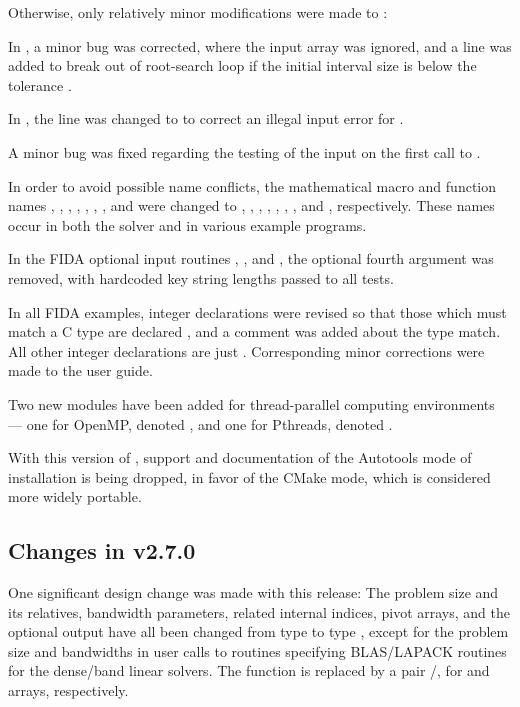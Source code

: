 Otherwise, only relatively minor modifications were made to {\ida}:

In , a minor bug was corrected, where the input
array  was ignored, and a line was added to break out of
root-search loop if the initial interval size is below the tolerance
.

In , the line  was changed to
 to correct an illegal input error for .

A minor bug was fixed regarding the testing of the input  on
the first call to .

In order to avoid possible name conflicts, the mathematical macro
and function names , , , , ,
, , and  were changed to
, , , , ,
, , and , respectively.
These names occur in both the solver and in various example programs.

In the FIDA optional input routines , ,
and , the optional fourth argument  was
removed, with hardcoded key string lengths passed to all 
tests.

In all FIDA examples, integer declarations were revised so that
those which must match a C type  are declared ,
and a comment was added about the type match.  All other integer
declarations are just .  Corresponding minor corrections were
made to the user guide.

Two new {\nvector} modules have been added for thread-parallel computing
environments --- one for OpenMP, denoted ,
and one for Pthreads, denoted .

With this version of {\sundials}, support and documentation of the
Autotools mode of installation is being dropped, in favor of the
CMake mode, which is considered more widely portable.

\subsection*{Changes in v2.7.0}

One significant design change was made with this release: The problem
size and its relatives, bandwidth parameters, related internal indices,
pivot arrays, and the optional output  have all been
changed from type  to type , except for the
problem size and bandwidths in user calls to routines specifying
BLAS/LAPACK routines for the dense/band linear solvers.  The function
 is replaced by a pair /,
for  and  arrays, respectively.

